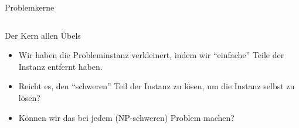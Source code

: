 \begin{frame}{Problemkerne}
\begin{columns}
\begin{column}{0.5\linewidth}
    \centering
    \end{column}
    \begin{column}{0.45\linewidth}
    \end{column}
  \end{columns}
    
\end{frame}

\begin{frame}{Der Kern allen Übels}
    \begin{itemize}
        \item Wir haben die Probleminstanz verkleinert, indem wir \enquote{einfache} Teile der Instanz entfernt haben. 

        \item Reicht es, den \enquote{schweren} Teil der Instanz zu lösen, um die Instanz selbst zu lösen?

        \item Können wir das bei jedem (NP-schweren) Problem machen?
    \end{itemize}
\end{frame}


